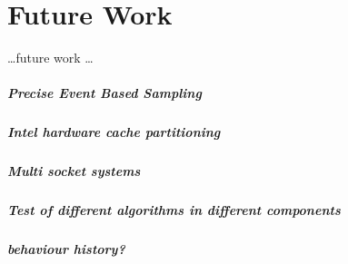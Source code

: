 \chapter{Future Work}
\label{sec:futurework}

\ldots future work \ldots


\paragraph{Precise Event Based Sampling}
\paragraph{Intel hardware cache partitioning}
\paragraph{Multi socket systems}
\paragraph{Test of different algorithms in different components}
\paragraph{behaviour history?}

\cleardoublepage

